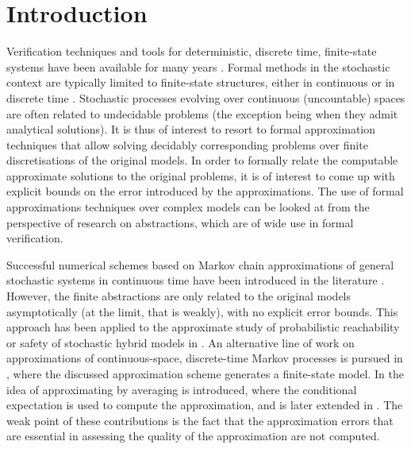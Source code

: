 \documentclass{LMCS}
\begin{document}
\maketitle

\section{Introduction}
\label{sec:intro}
Verification techniques and tools for deterministic, discrete time, finite-state systems have been available for many years \cite{Kur94}. 
Formal methods in the stochastic context are typically limited to finite-state structures, 
either in continuous or in discrete time \cite{BKH99,KNSS00}.
Stochastic processes evolving over continuous (uncountable) spaces are often related to undecidable problems (the exception being when they admit analytical solutions).
It is thus of interest to resort to formal approximation techniques that allow solving decidably corresponding problems over finite discretisations of the original models.
In order to formally relate the computable approximate solutions to the original problems,  
it is of interest to come up with explicit bounds on the error introduced by the approximations. 
The use of formal approximations techniques over complex models can be looked at from the perspective of research on abstractions, 
which are of wide use in formal verification. 

Successful numerical schemes based on Markov chain approximations of 
general stochastic systems in continuous time have been introduced in the literature \cite{KD01}.
However, the finite abstractions are only related to the original models asymptotically (at the limit, that is weakly), with no explicit error bounds. 
This approach has been applied to the approximate study of probabilistic reachability or safety of stochastic hybrid models in \cite{KR06,PH06}.
An alternative line of work on approximations of continuous-space, discrete-time Markov processes is pursued in \cite{DDP04,DGJP03}, 
where the discussed approximation scheme generates a finite-state model.
In \cite{DDP03} the idea of approximating by averaging is introduced,
where the conditional expectation is used to compute the approximation,
and is later extended in \cite{CDPP14}.
The weak point of these contributions is the fact that the approximation errors that are essential in assessing the quality of the approximation are not computed.
 
\end{document}
